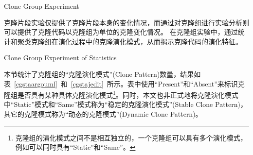 
{Clone Group Experiment} 

克隆片段实验仅提供了克隆片段本身的变化情况，而通过对克隆组进行实验分析则可以提供了克隆代码以克隆组为单位的克隆变化情况。 在克隆组实验中，通过统计和聚类克隆组在演化过程中的克隆演化模式，从而揭示克隆代码的演化特征。

{Clone Group Experiment of Statistics} 

本节统计了克隆组的“克隆演化模式”(Clone Pattern)数量，结果如表~\ref{cgstaargouml}~和~\ref{cgstajedit}~所示。表中使用“Present”和“Absent”来标识克隆组是否具有某种具体克隆演化模式\footnote{克隆组的演化模式之间不是相互独立的，一个克隆组可以具有多个演化模式，例如可以同时具有“Static”和“Same”。}。同时，本文也非正式地将克隆演化模式中“Static”模式和“Same”模式称为“稳定的克隆演化模式”(Stable Clone Pattern)，其它的克隆模式称为“动态的克隆模式”(Dynamic Clone Pattern)。

